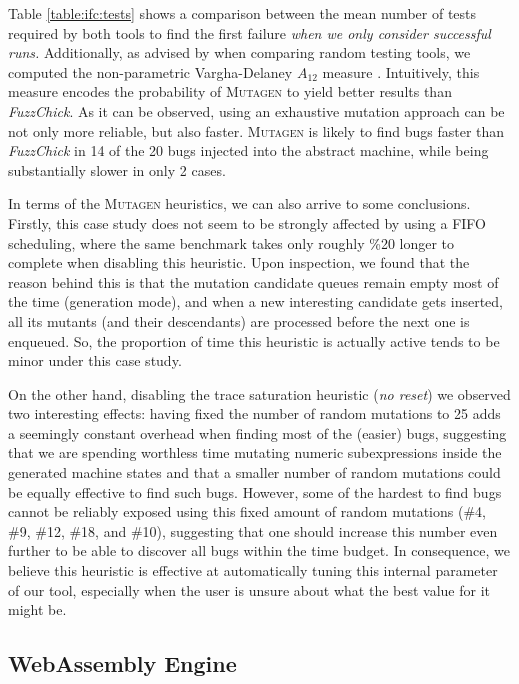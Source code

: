 \documentclass[acmsmall, anonymous]{acmart}
\newcommand{\fuzzchick}{\textit{FuzzChick}\xspace}
\newcommand{\mutagen}{\textsc{Mutagen}\xspace}
\begin{document}
Table \ref{table:ifc:tests} shows a comparison between the mean number of tests
required by both tools to find the first failure \emph{when we only consider
  successful runs.}
%
Additionally, as advised by \cite{arcuri2014hitchhiker} when comparing random
testing tools, we computed the non-parametric Vargha-Delaney $A_{12}$ measure
\cite{vargha2000critique}.
%
Intuitively, this measure encodes the probability of \mutagen to yield better
results than \fuzzchick.
%
As it can be observed, using an exhaustive mutation approach can be not only
more reliable, but also faster.
%
\mutagen is likely to find bugs faster than \fuzzchick in 14 of the 20 bugs
injected into the abstract machine, while being substantially slower in only 2
cases.


In terms of the \mutagen heuristics, we can also arrive to some conclusions.
%
Firstly, this case study does not seem to be strongly affected by using a FIFO
scheduling, where the same benchmark takes only roughly \%20 longer to complete
when disabling this heuristic.
%
Upon inspection, we found that the reason behind this is that the mutation
candidate queues remain empty most of the time (generation mode), and when a new
interesting candidate gets inserted, all its mutants (and their descendants) are
processed before the next one is enqueued.
%
So, the proportion of time this heuristic is actually active tends to be minor
under this case study.


On the other hand, disabling the trace saturation heuristic (\textit{no reset})
we observed two interesting effects:
%
having fixed the number of random mutations to 25 adds a seemingly constant
overhead when finding most of the (easier) bugs, suggesting that we are spending
worthless time mutating numeric subexpressions inside the generated machine
states and that a smaller number of random mutations could be equally effective
to find such bugs.
%
However, some of the hardest to find bugs cannot be reliably exposed using this
fixed amount of random mutations (\#4, \#9, \#12, \#18, and \#10), suggesting
that one should increase this number even further to be able to discover all
bugs within the time budget.
%
In consequence, we believe this heuristic is effective at automatically tuning
this internal parameter of our tool, especially when the user is unsure about
what the best value for it might be.


\subsection{WebAssembly Engine}
\end{document}
